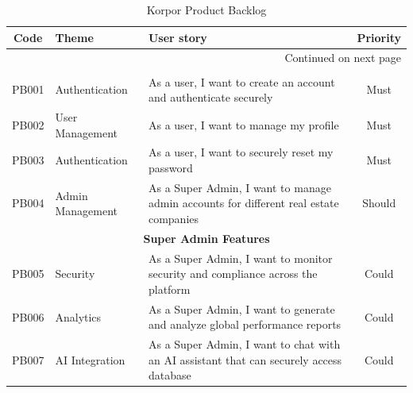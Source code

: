 \begin{longtable}{|c|l|p{8cm}|c|}
    \caption{Korpor Product Backlog\label{tab:product-backlog}} \\
        \hline
        \textbf{Code} & \textbf{Theme} & \textbf{User story} & \textbf{Priority} \\
        \hline
    \endfirsthead
    
    \hline
    \endhead
    
    \hline \multicolumn{4}{|r|}{{Continued on next page}} \\ \hline
    \endfoot
    
    \hline
    \endlastfoot
    
    \multicolumn{4}{|c|}{\cellcolor{primary!15}\textbf{\textcolor{primary}{Authentication \& User Management}}} \\
    \hline
    PB001 & Authentication & As a user, I want to create an account and authenticate securely & Must \\
    \hline
    PB002 & User Management & As a user, I want to manage my profile & Must \\
    \hline
    PB003 & Authentication & As a user, I want to securely reset my password & Must \\
    \hline
    PB004 & Admin Management & As a Super Admin, I want to manage admin accounts for different real estate companies & Should \\
    \hline
    
    
    \multicolumn{4}{|c|}{\cellcolor{primary!15}\textbf{\textcolor{primary}{Super Admin Features}}} \\
    \hline
    PB005 & Security & As a Super Admin, I want to monitor security and compliance across the platform & Could \\
    \hline
    PB006 & Analytics & As a Super Admin, I want to generate and analyze global performance reports & Could \\
    \hline
    PB007 & AI Integration & As a Super Admin, I want to chat with an AI assistant that can securely access database & Could \\
    \hline
    



\end{longtable}

